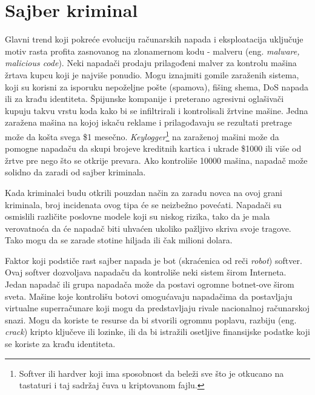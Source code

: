 \documentclass[a4paper]{article}
\theoremstyle{break}
\begin{document}
{\section{Sajber kriminal}
\label{sec:sajber_kriminal}


Glavni trend koji pokreće evoluciju računarskih napada i eksploatacija uključuje motiv rasta profita zasnovanog na zlonamernom kodu - malveru (eng. {\em malware, malicious code}). Neki napadači prodaju prilagođeni malver za kontrolu mašina žrtava kupcu koji je najviše ponudio. Mogu iznajmiti gomile zaraženih sistema, koji su korisni za isporuku nepoželjne pošte (spamova), fišing shema, DoS napada ili za krađu identiteta. Špijunske kompanije i preterano agresivni oglašivači kupuju takvu vrstu koda kako bi se infiltrirali i kontrolisali žrtvine mašine. Jedna zaražena mašina na kojoj iskaču reklame i prilagođavaju se rezultati pretrage može da košta svega \$1 mesečno. {\em Keylogger}\footnote{Softver ili hardver koji ima sposobnost da beleži sve što je otkucano na tastaturi i taj sadržaj čuva u kriptovanom fajlu.} na zaraženoj mašini može da pomogne napadaču da skupi brojeve kreditnih kartica i ukrade \$1000 ili više od žrtve pre nego što se otkrije prevara. Ako kontroliše 10000 mašina, napadač može solidno da zaradi od sajber kriminala. 

Kada kriminalci budu otkrili pouzdan način za zaradu novca na ovoj grani kriminala, broj incidenata ovog tipa će se neizbežno povećati. Napadači su osmislili različite poslovne modele koji su niskog rizika, tako da je mala verovatnoća da će napadač biti uhvaćen ukoliko pažljivo skriva svoje tragove. Tako mogu da se zarade stotine hiljada ili čak milioni dolara.

Faktor koji podstiče rast sajber napada je bot (skraćenica od reči \textit{robot}) softver. Ovaj softver dozvoljava napadaču da kontroliše neki sistem širom Interneta. Jedan napadač ili grupa napadača može da postavi ogromne botnet-ove širom sveta. Mašine koje kontrolišu botovi omogućavaju napadačima da postavljaju virtualne superračunare koji mogu da predstavljaju rivale nacionalnoj računarskoj snazi. Mogu da koriste te resurse da bi stvorili ogromnu poplavu, razbiju (eng. {\em crack}) kripto ključeve ili lozinke, ili da bi istražili osetljive finansijske podatke koji se koriste za krađu identiteta.

}
\end{document}
